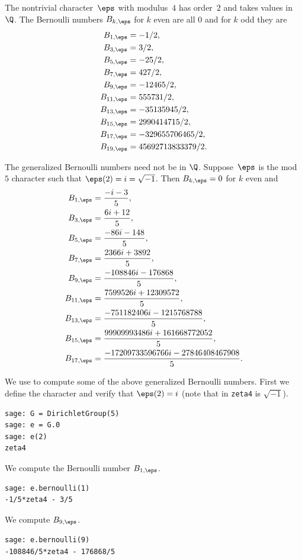 \begin{example}
The nontrivial character~$\eps$  with modulus~$4$
has order~$2$ and takes values in~$\Q$.  The Bernoulli
numbers $B_{k,\eps}$ for $k$ even are all $0$ and for $k$ odd
they are
\begin{align*}
B_{1,\eps} &= -1/2,\\
B_{3,\eps} &= 3/2,\\
B_{5,\eps} &= -25/2,\\
B_{7,\eps} &= 427/2,\\
B_{9,\eps} &= -12465/2,\\
B_{11,\eps} &= 555731/2,\\
B_{13,\eps} &= -35135945/2,\\
B_{15,\eps} &= 2990414715/2,\\
B_{17,\eps} &= -329655706465/2,\\
B_{19,\eps} &= 45692713833379/2.
\end{align*}
\end{example}

\begin{example}
  The generalized Bernoulli numbers
  need not be in $\Q$.  Suppose~$\eps$ is the mod~$5$ character
such that $\eps(2) = i = \sqrt{-1}$.  Then  $B_{k,\eps}=0$ for $k$ even
and
\begin{align*}
B_{1,\eps} &= \frac{-i - 3}{5},\\
B_{3,\eps} &= \frac{6i + 12}{5},\\
B_{5,\eps} &= \frac{-86i - 148}{5},\\
B_{7,\eps} &= \frac{2366i + 3892}{5},\\
B_{9,\eps} &= \frac{-108846i - 176868}{5},\\
B_{11,\eps} &= \frac{7599526i + 12309572}{5},\\
B_{13,\eps} &= \frac{-751182406i - 1215768788}{5},\\
B_{15,\eps} &= \frac{99909993486i + 161668772052}{5},\\
B_{17,\eps} &= \frac{-17209733596766i - 27846408467908}{5}.\\
\end{align*}


\end{example}

\begin{example}
We use \sage{} to compute some of the above generalized Bernoulli numbers.
First we define the character and verify that $\eps(2)=i$ (note that
in \sage{} {\tt zeta4} is $\sqrt{-1}$).
\begin{verbatim}
sage: G = DirichletGroup(5)
sage: e = G.0
sage: e(2)
zeta4
\end{verbatim}%

We compute the Bernoulli number $B_{1,\eps}$.
\begin{verbatim}
sage: e.bernoulli(1)
-1/5*zeta4 - 3/5
\end{verbatim}%

We compute $B_{9,\eps}$.
\begin{verbatim}
sage: e.bernoulli(9)
-108846/5*zeta4 - 176868/5
\end{verbatim}
\end{example}

